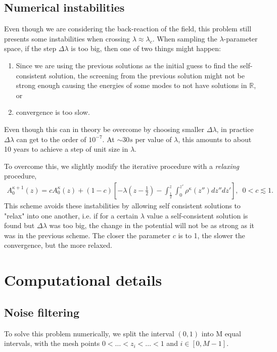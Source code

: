 \subsection{Numerical instabilities}
Even though we are considering the back-reaction of the field, this problem still presents some instabilities when crossing $\lambda\approx \lambda_c$. When sampling the $\lambda$-parameter space, if the step  $\Delta \lambda$ is too big, then one of two things might happen:
\begin{enumerate}
	\item Since we are using the previous solutions as the initial guess to find the self-consistent solution, the screening from the previous solution might not be strong enough causing the energies of some modes to not have solutions in $\mathbb{R}$, or
	\item convergence is too slow.
\end{enumerate}
Even though this can in theory be overcome by choosing smaller $\Delta \lambda$, in practice $\Delta \lambda$ can get to the order of  $10^{-7}$. At $\sim 30s $ per value of $\lambda$, this amounts to about 10 years to  achieve a step of unit size in $\lambda$.

To overcome this, we slightly modify the iterative procedure with a \textit{relaxing} procedure, 
\begin{align}
	A_0^{\kappa+1}(z) = c A_0^{\kappa}(z)+ (1-c) \left[ -\lambda \left( z-\frac{1}{2} \right) - \int_{\frac{1}{2}}^{z} \int_{0}^{z'} \rho^{\kappa} (z'') dz'' dz'   \right], \,\,\, 0< c \lesssim 1.
\end{align}
This scheme avoids these instabilities by allowing self consistent solutions to "relax" into one another, i.e. if for a certain $\lambda$ value a self-consistent solution is found but $\Delta \lambda$ was too big, the change in the potential will not be as strong as it was in the previous scheme. The closer the parameter $c$ is to 1, the slower the convergence, but the more relaxed.

\section{Computational details}

\subsection{Noise filtering}
To solve this problem numerically, we split the interval $(0, 1)$ into M equal intervals, with the mesh points $0<\ldots<z_i<\ldots<1$ and  $i\in \left[ 0, M-1 \right] $.

